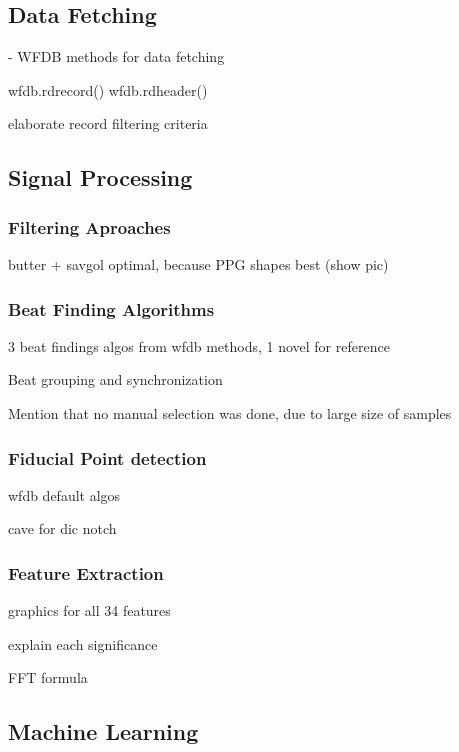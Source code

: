 \subsection{Data Fetching}
\label{subsec:data-fetching}

- WFDB methods for data fetching

wfdb.rdrecord()
wfdb.rdheader()

elaborate record filtering criteria

\subsection{Signal Processing}
\label{subsec:signal-processing}

\subsubsection{Filtering Aproaches}

butter + savgol optimal, because PPG shapes best (show pic)

\subsubsection{Beat Finding Algorithms}

3 beat findings algos from wfdb methods, 1 novel for reference

Beat grouping and synchronization

Mention that no manual selection was done, due to large size of samples

\subsubsection{Fiducial Point detection}

wfdb default algos

cave for dic notch

\subsubsection{Feature Extraction}

graphics for all 34 features

explain each significance

FFT formula

\subsection{Machine Learning}\label{subsec:ml_methods}

